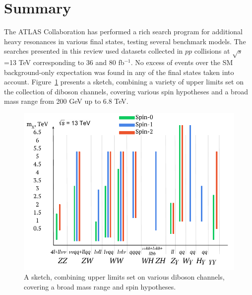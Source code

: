 \documentclass{PoS}
\begin{document}
\section{Summary}
\label{sec:sum}

The ATLAS Collaboration has performed a rich search program for additional heavy resonances in various final states, testing several benchmark models.
The searches presented in this review used datasets collected in $pp$ collisions at $\sqrt{s}$=13 TeV corresponding to 36 and 80 fb$^{-1}$.
No excess of events over the SM background-only expectation was found in any of the final states taken into account. 
Figure~\ref{fig:summary} presents a sketch, combining a variety of upper limits set on the collection of diboson channels, covering various spin hypotheses and a broad mass range from 200 GeV up to 6.8 TeV.


  \begin{figure}
    \begin{center} 
    \includegraphics[width=.65\textwidth]{figures/lim_sketch}
    \end{center}
     \caption{A sketch, combining upper limits set on various diboson channels, covering a broad mass range and spin hypotheses.}
     \label{fig:summary}
     \end{figure}







%
\end{document}
